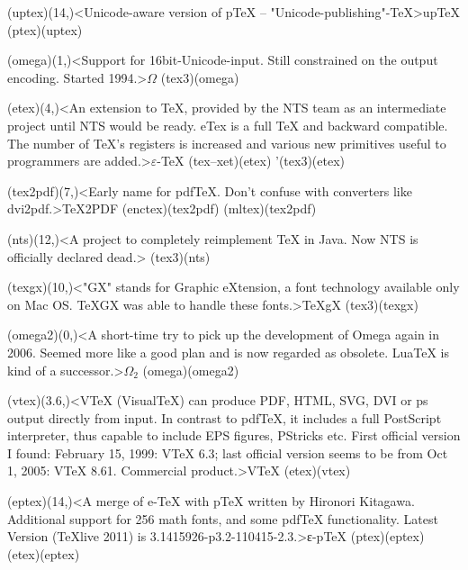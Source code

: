 {	\tonode[\experimental](uptex)(14,\layer)<Unicode-aware version of pTeX – "Unicode-publishing"-TeX>{up\TeX}
		\todraw(ptex)(uptex)
	\steplayer[-2]

	\tonode[\experimental](omega)(1,\layer)<Support for 16bit-Unicode-input. Still constrained on the output encoding. Started 1994.>{$\Omega$}
		\todraw(tex3)(omega)
	
	\tonode[\vip](etex)(4,\layer)<An extension to TeX, provided by the NTS team as an intermediate project until NTS would be ready. eTex is a full TeX and backward compatible. The number of TeX's registers is increased and various new primitives useful to programmers are added.>{$\varepsilon$-\TeX}
		\todraw(tex--xet)(etex)
		\todraw'(tex3)(etex)

	\tonode(tex2pdf)(7,\layer)<Early name for pdfTeX. Don't confuse with converters like dvi2pdf.>{\TeX2PDF}
		\todraw(enctex)(tex2pdf)
		\todraw(mltex)(tex2pdf)
	
	\tonode(nts)(12,\layer)<A project to completely reimplement TeX in Java. Now NTS is officially declared dead.>{\NTS}
		\todraw(tex3)(nts)

	\steplayer[-1]

	\tonode(texgx)(10,\layer)<"GX" stands for Graphic eXtension, a font technology available only on Mac OS. TeXGX was able to handle these fonts.>{\TeX{}gX}
		\todraw(tex3)(texgx)

	\steplayer[-1]

	\tonode[\experimental](omega2)(0,\layer)<A short-time try to pick up the development of Omega again in 2006. Seemed more like a good plan and is now regarded as obsolete. LuaTeX is kind of a successor.>{$\Omega_2$}
		\todraw(omega)(omega2)
	
	\tonode[\experimental](vtex)(3.6,\layer)<VTeX (VisualTeX) can produce PDF, HTML, SVG, DVI or ps output directly from input. In contrast to pdfTeX, it includes a full PostScript interpreter, thus capable to include EPS figures, PStricks etc. First official version I found: February 15, 1999: VTeX 6.3; last official version seems to be from Oct 1, 2005: VTeX 8.61. Commercial product.>{V\TeX}
		\todraw(etex)(vtex)

	\steplayer[-1]

	\tonode(eptex)(14,\layer)<A merge of e-TeX with pTeX written by Hironori Kitagawa. Additional support for 256 math fonts, and some pdfTeX functionality. Latest Version (TeXlive 2011) is 3.1415926-p3.2-110415-2.3.>{ε-p\TeX}
		\todraw(ptex)(eptex)
		\todraw(etex)(eptex)

}
